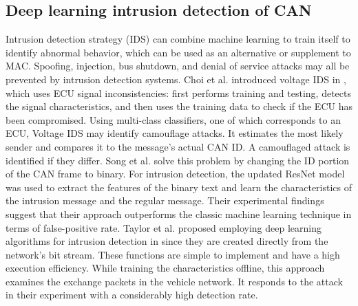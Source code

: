 \documentclass[lettersize,journal]{IEEEtran}
\begin{document}
\subsection{Deep learning intrusion detection of CAN}
Intrusion detection strategy (IDS) can combine machine learning to train itself to identify abnormal behavior, which can be used as an alternative or supplement to MAC. Spoofing, injection, bus shutdown, and denial of service attacks may all be prevented by intrusion detection systems. Choi et al. introduced voltage IDS in \cite{47}, which uses ECU signal inconsistencies: first performs training and testing, detects the signal characteristics, and then uses the training data to check if the ECU has been compromised. Using multi-class classifiers, one of which corresponds to an ECU, Voltage IDS may identify camouflage attacks. It estimates the most likely sender and compares it to the message's actual CAN ID. A camouflaged attack is identified if they differ. Song et al. \cite{48} solve this problem by changing the ID portion of the CAN frame to binary. For intrusion detection, the updated ResNet model was used to extract the features of the binary text and learn the characteristics of the intrusion message and the regular message. Their experimental findings suggest that their approach outperforms the classic machine learning technique in terms of false-positive rate. Taylor et al. proposed employing deep learning algorithms for intrusion detection in \cite{49} since they are created directly from the network's bit stream. These functions are simple to implement and have a high execution efficiency. While training the characteristics offline, this approach examines the exchange packets in the vehicle network. It responds to the attack in their experiment with a considerably high detection rate.
\end{document}
